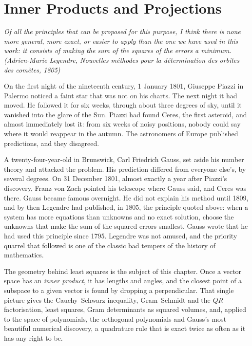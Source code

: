 \chapter{Inner Products and Projections}\label{ch:inner}

\begin{center}\itshape
Of all the principles that can be proposed for this purpose, I think there is none more general, more exact, or easier
to apply than the one we have used in this work: it consists of making the sum of the squares of the errors a minimum.
\upshape(Adrien-Marie Legendre, \emph{Nouvelles m\'ethodes pour la d\'etermination des orbites des com\`etes}, 1805)
\end{center}

On the first night of the nineteenth century, 1 January 1801, Giuseppe Piazzi in Palermo noticed a faint star that
was not on his charts. The next night it had moved. He followed it for six weeks, through about three degrees of sky,
until it vanished into the glare of the Sun. Piazzi had found Ceres, the first asteroid, and almost immediately lost
it: from six weeks of noisy positions, nobody could say where it would reappear in the autumn. The astronomers of
Europe published predictions, and they disagreed.

A twenty-four-year-old in Brunswick, Carl Friedrich Gauss, set aside his number theory and attacked the problem. His
prediction differed from everyone else's, by several degrees. On 31 December 1801, almost exactly a year after Piazzi's
discovery, Franz von Zach pointed his telescope where Gauss said, and Ceres was there. Gauss became famous overnight.
He did not explain his method until 1809, and by then Legendre had published, in 1805, the principle quoted above: when
a system has more equations than unknowns and no exact solution, choose the unknowns that make the sum of the squared
errors smallest. Gauss wrote that he had used this principle since 1795. Legendre was not amused, and the priority
quarrel that followed is one of the classic bad tempers of the history of mathematics.

The geometry behind least squares is the subject of this chapter. Once a vector space has an \emph{inner product}, it
has lengths and angles, and the closest point of a subspace to a given vector is found by dropping a perpendicular. That
single picture gives the Cauchy--Schwarz inequality, Gram--Schmidt and the $QR$ factorisation, least squares, Gram
determinants as squared volumes, and, applied to the space of polynomials, the orthogonal polynomials and Gauss's most
beautiful numerical discovery, a quadrature rule that is exact twice as often as it has any right to be.

